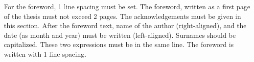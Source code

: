 For the foreword, 1 line spacing must be set. The foreword, written
as a first page of the thesis must not exceed 2 pages. The 
acknowledgements must be given in this section.
After the foreword text, name of the author (right-aligned), and
the date (as month and year) must be written (left-aligned). Surnames should be capitalized. These two expressions must be in the same line. The foreword is written with 1 line spacing.